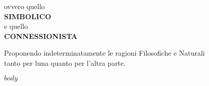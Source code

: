 \documentclass[12pt,a4paper]{report}
\begin{document}
\begin{titlepage}
\begin{center}


	\vspace{8mm}
	{{ovvero quello}}\\
	\vspace{1mm}
	{{\bf SIMBOLICO}}\\
	\vspace{2mm}
	{{e quello}}\\
	\vspace{1mm}
	{{\bf CONNESSIONISTA}}\\

	\end{center}
	\vspace{20mm}
	\begin{center}
	{Proponendo indeterminatamente le ragioni Filosofiche e Naturali}\\
	\vspace{2mm}
	{tanto per l\textquotesingle una quanto per l'altra parte.}\\
	\end{center}
\end{titlepage}

\shipout\null

\begingroup
	\hypersetup{linkcolor=black}
	\tableofcontents
\endgroup

\newpage

$body$
\end{document}
